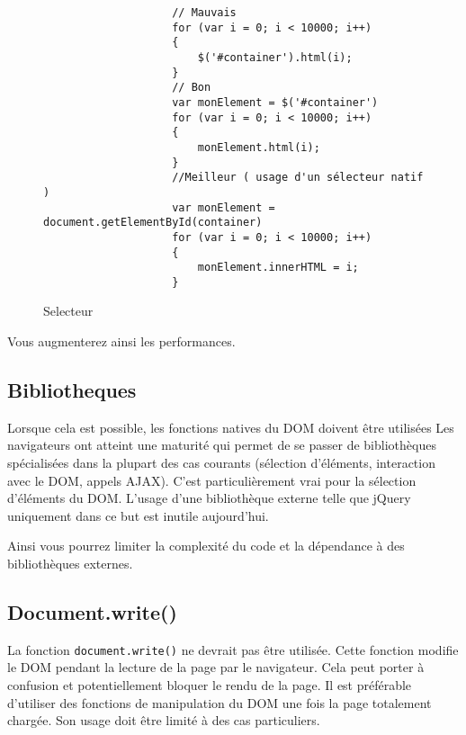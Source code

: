 			\begin{figure}[H]
				\begin{changemargin}{-2.5cm}{-2.5cm}
				\begin{tcolorbox}
				\begin{verbatim}
					// Mauvais
					for (var i = 0; i < 10000; i++)
					{
					    $('#container').html(i);
					}
					// Bon
					var monElement = $('#container')
					for (var i = 0; i < 10000; i++)
					{
					    monElement.html(i);
					}
					//Meilleur ( usage d'un sélecteur natif )
					var monElement = document.getElementById(container)
					for (var i = 0; i < 10000; i++)
					{
					    monElement.innerHTML = i;
					}
				\end{verbatim}
				\end{tcolorbox}
				\end{changemargin}
				\caption{Selecteur}
			\end{figure}

			Vous augmenterez ainsi les performances.

		\subsection{Bibliotheques}
			Lorsque cela est possible, les fonctions natives du DOM doivent être utilisées Les navigateurs ont atteint une maturité qui permet de se passer de bibliothèques spécialisées dans la plupart des cas courants (sélection d'éléments, interaction avec le DOM, appels AJAX). C'est particulièrement vrai pour la sélection d'éléments du DOM. L'usage d'une bibliothèque externe telle que jQuery uniquement dans ce but est inutile aujourd'hui.

			Ainsi vous pourrez limiter la complexité du code et la dépendance à des bibliothèques externes.

		\subsection{Document.write()}
			La fonction \verb+document.write()+ ne devrait pas être utilisée. Cette fonction modifie le DOM pendant la lecture de la page par le navigateur. Cela peut porter à confusion et potentiellement bloquer le rendu de la page. Il est préférable d'utiliser des fonctions de manipulation du DOM une fois la page totalement chargée. Son usage doit être limité à des cas particuliers.